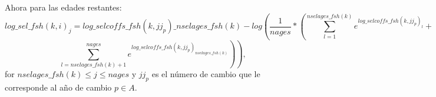 \documentclass{article}
\begin{document}
\begin{itemize}
  Ahora para las edades restantes:
    \begin{equation}
         log\_sel\_fsh(k,i)_j=log\_selcoffs\_fsh(k,jj_p)\_{nselages\_fsh(k)}-log\left(\dfrac{1}{nages}*\left(\sum_{l=1}^{nselages\_fsh(k)}e^{log\_selcoffs\_fsh(k,jj_p)_l}+\right.\right.
    \end{equation}
 \begin{equation*}
       \left. \left.\sum_{l=nselages\_fsh(k)+1}^{nages}e^{log\_selcoffs\_fsh(k,jj_p)_{nselages\_fsh(k)}}\right)\right), 
    \end{equation*}
    for $nselages\_fsh(k)\leq j \leq nages$ y $jj_p$ es el número de cambio que le corresponde al año de cambio $p\in A$.














    
   
    

\end{itemize}
\end{document}
